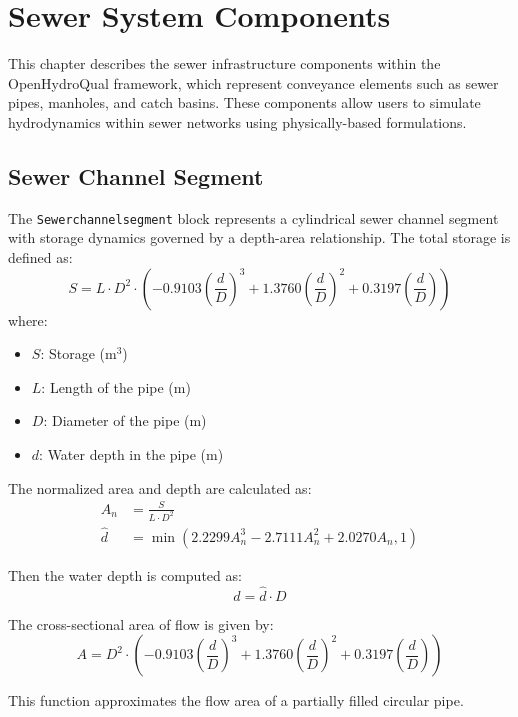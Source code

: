 \documentclass[12pt]{report}
\begin{document}
\chapter{Sewer System Components}

This chapter describes the sewer infrastructure components within the OpenHydroQual framework, which represent conveyance elements such as sewer pipes, manholes, and catch basins. These components allow users to simulate hydrodynamics within sewer networks using physically-based formulations.

\section{Sewer Channel Segment}

The \texttt{Sewerchannelsegment} block represents a cylindrical sewer channel segment with storage dynamics governed by a depth-area relationship. The total storage is defined as:
\begin{equation}
S = L \cdot D^2 \cdot \left(-0.9103 \left(\frac{d}{D}\right)^3 + 1.3760 \left(\frac{d}{D}\right)^2 + 0.3197 \left(\frac{d}{D}\right)\right)
\end{equation}
where:
\begin{itemize}
\item $S$: Storage (m$^3$)
\item $L$: Length of the pipe (m)
\item $D$: Diameter of the pipe (m)
\item $d$: Water depth in the pipe (m)
\end{itemize}

The normalized area and depth are calculated as:
\begin{align}
A_n &= \frac{S}{L \cdot D^2} \\
\hat{d} &= \min(2.2299 A_n^3 - 2.7111 A_n^2 + 2.0270 A_n, 1)
\end{align}

Then the water depth is computed as:
\begin{equation}
d = \hat{d} \cdot D
\end{equation}

The cross-sectional area of flow is given by:
\begin{equation}
A = D^2 \cdot \left(-0.9103 \left(\frac{d}{D}\right)^3 + 1.3760 \left(\frac{d}{D}\right)^2 + 0.3197 \left(\frac{d}{D}\right)\right)
\end{equation}

This function approximates the flow area of a partially filled circular pipe.
\end{document}
